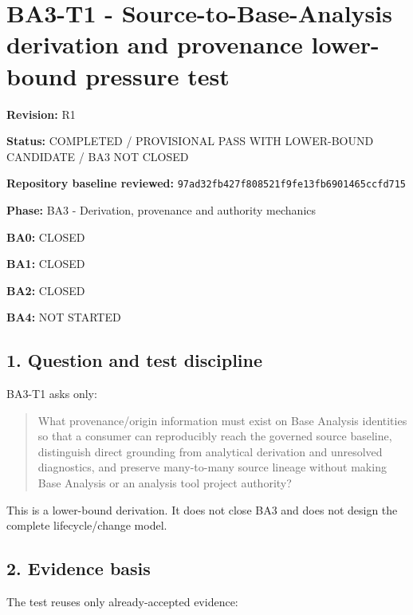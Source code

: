 \documentclass[11pt,a4paper]{article}
\begin{document}
\section{BA3-T1 - Source-to-Base-Analysis derivation and provenance lower-bound pressure test}\label{ba3-t1---source-to-base-analysis-derivation-and-provenance-lower-bound-pressure-test}

\textbf{Revision:} R1

\textbf{Status:} COMPLETED / PROVISIONAL PASS WITH LOWER-BOUND CANDIDATE / BA3 NOT CLOSED

\textbf{Repository baseline reviewed:} \texttt{97ad32fb427f808521f9fe13fb6901465ccfd715}

\textbf{Phase:} BA3 - Derivation, provenance and authority mechanics

\textbf{BA0:} CLOSED

\textbf{BA1:} CLOSED

\textbf{BA2:} CLOSED

\textbf{BA4:} NOT STARTED

\subsection{1. Question and test discipline}\label{1-question-and-test-discipline}

BA3-T1 asks only:

\begin{quote}
What provenance/origin information must exist on Base Analysis identities so that a consumer can reproducibly reach the governed source baseline, distinguish direct grounding from analytical derivation and unresolved diagnostics, and preserve many-to-many source lineage without making Base Analysis or an analysis tool project authority?
\end{quote}

This is a lower-bound derivation. It does not close BA3 and does not design the complete lifecycle/change model.

\subsection{2. Evidence basis}\label{2-evidence-basis}

The test reuses only already-accepted evidence:
\end{document}
